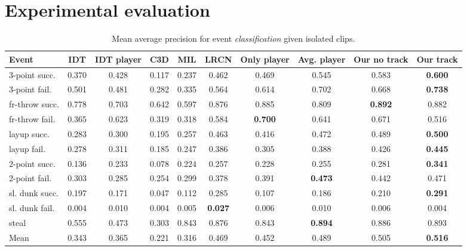 \section{Experimental evaluation}
\label{sec:experiments}

\begin{table}[ht!]
\begin{center}
\small
 \begin{tabular}{|l|c|c|c|c|c|c|c|c|c|}
  \hline
Event & IDT\cite{Wang_CVPR11} & IDT\cite{Wang_CVPR11} player & C3D \cite{Tran_arxiv14} & MIL\cite{Andrews_NIPS02} &  LRCN \cite{Donahue_arxiv14} &Only player & Avg. player & Our no track & Our track \\ \hline \hline

  3-point succ.    & 0.370 & 0.428 & 0.117 & 0.237 & 0.462   & 0.469 & 0.545 & 0.583 & \textbf{0.600} \\
  3-point fail.    & 0.501 &  0.481& 0.282 & 0.335 & 0.564   & 0.614 & 0.702 & 0.668 & \textbf{0.738} \\
  fr-throw succ. & 0.778 &  0.703& 0.642   & 0.597 & 0.876   & 0.885 & 0.809 & \textbf{0.892} & 0.882 \\
  fr-throw fail. & 0.365 &  0.623& 0.319   & 0.318 & 0.584    & \textbf{0.700} & 0.641 & 0.671 & 0.516 \\
  layup succ.      & 0.283 & 0.300 & 0.195 & 0.257 & 0.463   & 0.416 & 0.472 & 0.489 & \textbf{0.500} \\
  layup fail.      & 0.278 &0.311  & 0.185 & 0.247 & 0.386   & 0.305 & 0.388 & 0.426 & \textbf{0.445} \\
  2-point succ.    & 0.136 &  0.233 & 0.078& 0.224 & 0.257    & 0.228 & 0.255 & 0.281 & \textbf{0.341} \\
  2-point fail.    & 0.303 &  0.285 & 0.254& 0.299 & 0.378   & 0.391 & \textbf{0.473} & 0.442 & 0.471 \\
  sl. dunk succ.  & 0.197 &  0.171 & 0.047 & 0.112 & 0.285   & 0.107 & 0.186 & 0.210 & \textbf{0.291} \\
  sl. dunk fail.  & 0.004 &  0.010 & 0.004 & 0.005 & \textbf{0.027} & 0.006 & 0.010 & 0.006 & 0.004 \\
  steal            & 0.555 &  0.473& 0.303 & 0.843 & 0.876 &  0.843 & \textbf{0.894} & 0.886 & 0.893 \\ \hline \hline
Mean             & 0.343 &  0.365 & 0.221  & 0.316 & 0.469 & 0.452 & 0.489 & 0.505 & \textbf{0.516} \\ \hline
  \end{tabular}
\end{center}
  \caption{Mean average precision for event {\em classification} given
    isolated clips.}
  \label{tab:event_class}
  \label{tab:class_res}
\end{table}


